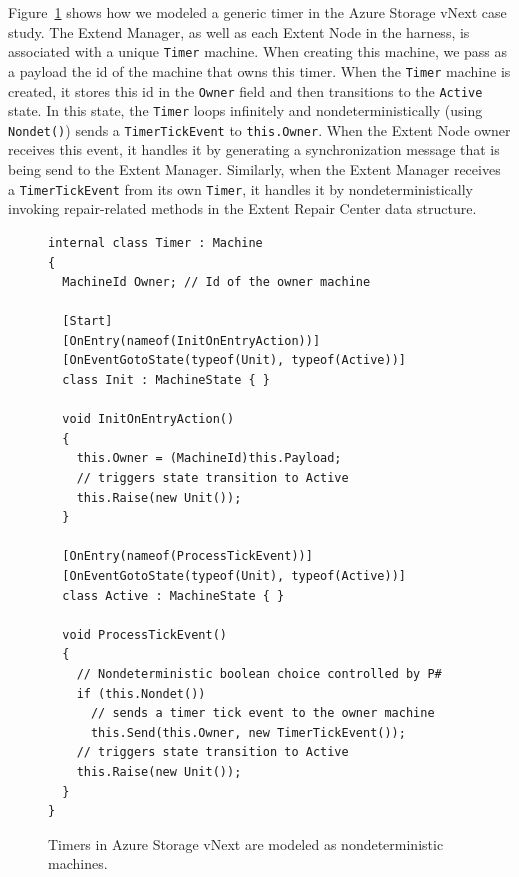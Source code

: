 Figure~\ref{fig:timer} shows how we modeled a generic timer in the Azure Storage vNext case study. The Extend Manager, as well as each Extent Node in the harness, is associated with a unique \texttt{Timer} machine. When creating this machine, we pass as a payload the id of the machine that owns this timer. When the \texttt{Timer} machine is created, it stores this id in the \texttt{Owner} field and then transitions to the \texttt{Active} state. In this state, the \texttt{Timer} loops infinitely and nondeterministically (using \texttt{Nondet()}) sends a \texttt{TimerTickEvent} to \texttt{this.Owner}. When the Extent Node owner receives this event, it handles it by generating a synchronization message that is being send to the Extent Manager. Similarly, when the Extent Manager receives a \texttt{TimerTickEvent} from its own \texttt{Timer}, it handles it by nondeterministically invoking repair-related methods in the Extent Repair Center data structure. 

\begin{figure}[t]
\begin{lstlisting}
internal class Timer : Machine
{
  MachineId Owner; // Id of the owner machine

  [Start]
  [OnEntry(nameof(InitOnEntryAction))]
  [OnEventGotoState(typeof(Unit), typeof(Active))]
  class Init : MachineState { }

  void InitOnEntryAction()
  {
    this.Owner = (MachineId)this.Payload;
    // triggers state transition to Active
    this.Raise(new Unit());
  }

  [OnEntry(nameof(ProcessTickEvent))]
  [OnEventGotoState(typeof(Unit), typeof(Active))]
  class Active : MachineState { }

  void ProcessTickEvent()
  {
    // Nondeterministic boolean choice controlled by P#
    if (this.Nondet())
      // sends a timer tick event to the owner machine
      this.Send(this.Owner, new TimerTickEvent());
    // triggers state transition to Active
    this.Raise(new Unit());
  }
}
\end{lstlisting}
\vspace{-2mm}
\caption{Timers in Azure Storage vNext are modeled as nondeterministic \psharp machines.}
\label{fig:timer}
\end{figure}
